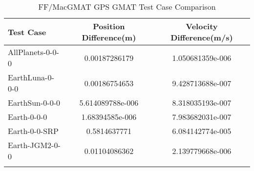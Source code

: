 \begin{table}[htbp!]
\centering
\caption{ FF/MacGMAT GPS GMAT Test Case Comparison}
      \begin{tabular}{lcc}
      \hline\hline
          Test Case & Position Difference(m) & Velocity Difference(m/s) \\
         \hline
         AllPlanets-0-0-0 & 0.00187286179 & 1.050681359e-006 \\
         EarthLuna-0-0-0 & 0.00186754653 & 9.428713688e-007 \\
         EarthSun-0-0-0 & 5.614089788e-006 & 8.318035193e-007 \\
         Earth-0-0-0 & 1.68394585e-006 & 7.983682031e-007 \\
         Earth-0-0-SRP & 0.5814637771 & 6.084142774e-005 \\
         Earth-JGM2-0-0 & 0.01104086362 & 2.139779668e-006 \\
      \hline\hline
      \label{Table: GPS GMAT Table} 
\end{tabular}
\end{table}
